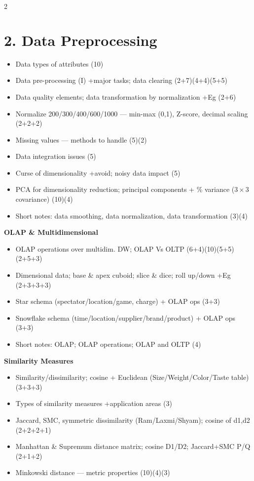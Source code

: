 \documentclass[10pt]{article}
\begin{document}
\begin{multicols}{2}
\section*{2. Data Preprocessing}
\begin{itemize}
  \item Data types of attributes \hfill (10)
  \item Data pre-processing (I) +major tasks; data clearing \hfill (2+7)(4+4)(5+5)
  \item Data quality elements; data transformation by normalization +Eg \hfill (2+6)
  \item Normalize 200/300/400/600/1000 --- min-max (0,1), Z-score, decimal scaling \hfill (2+2+2)
  \item Missing values --- methods to handle \hfill (5)(2)
  \item Data integration issues \hfill (5)
  \item Curse of dimensionality +avoid; noisy data impact \hfill (5)
  \item PCA for dimensionality reduction; principal components + \% variance ($3\times3$ covariance) \hfill (10)(4)
  \item Short notes: data smoothing, data normalization, data transformation \hfill (3)(4)
\end{itemize}
\textbf{OLAP \& Multidimensional}
\begin{itemize}
  \item OLAP operations over multidim. DW; OLAP Vs OLTP \hfill (6+4)(10)(5+5)(2+5+3)
  \item Dimensional data; base \& apex cuboid; slice \& dice; roll up/down +Eg \hfill (2+3+3+3)
  \item Star schema (spectator/location/game, charge) + OLAP ops \hfill (3+3)
  \item Snowflake schema (time/location/supplier/brand/product) + OLAP ops \hfill (3+3)
  \item Short notes: OLAP; OLAP operations; OLAP and OLTP \hfill (4)
\end{itemize}
\textbf{Similarity Measures}
\begin{itemize}
  \item Similarity/dissimilarity; cosine + Euclidean (Size/Weight/Color/Taste table) \hfill (3+3+3)
  \item Types of similarity measures +application areas \hfill (3)
  \item Jaccard, SMC, symmetric dissimilarity (Ram/Laxmi/Shyam); cosine of d1,d2 \hfill (2+2+2+1)
  \item Manhattan \& Supremum distance matrix; cosine D1/D2; Jaccard+SMC P/Q \hfill (2+1+2)
  \item Minkowski distance --- metric properties \hfill (10)(4)(3)
\end{itemize}


\end{multicols}
\end{document}
